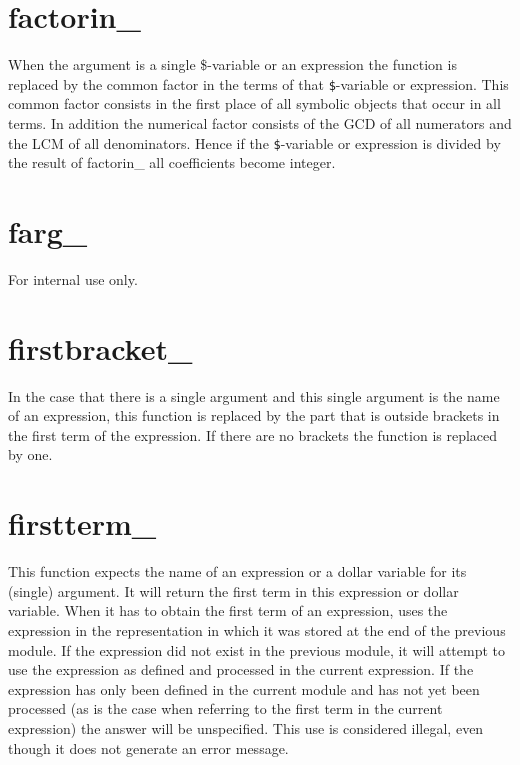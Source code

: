 \section{factorin\_}
\label{funfactorin}
\noindent When the argument is a single \$-variable or 
an expression the function is replaced by the common 
factor in the terms of that \verb:$:-variable or expression. This common 
factor consists in the first place of all symbolic objects that occur in 
all terms. In addition the numerical factor consists of the GCD 
of all numerators and the LCM of all denominators. Hence if the 
\verb:$:-variable or expression is divided by the result of factorin\_ all 
coefficients become integer.


\section{farg\_}
\label{funfarg}
\noindent For internal use only.


\section{firstbracket\_}
\label{funfirstbracket}
\noindent In the case that there is a single argument and this 
single argument is the name of an expression, this function is replaced by 
the part that is outside brackets in the first term of the expression. If 
there are no brackets the function is replaced by one.


\section{firstterm\_}
\label{funfirstterm}

\noindent This function expects the name of an expression or a dollar 
variable for its (single) argument. It will return the first term in this 
expression or dollar variable. When it has to obtain the first term of an 
expression, \FORM{} uses the expression in the representation in which it was 
stored at the end of the previous module. If the expression did not exist 
in the previous module, it will attempt to use the expression as defined 
and processed in the current expression. If the expression has only been 
defined in the current module and has not yet been processed (as is the 
case when referring to the first term in the current expression) the answer 
will be unspecified. This use is considered illegal, even though it does 
not generate an error message.

